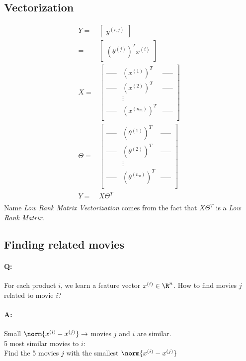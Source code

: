 \subsection{Vectorization}
\begin{align*}
	Y ={}      & \begin{bmatrix}
		y^{(i,j)}
	\end{bmatrix} \\
	={}        & \begin{bmatrix}
		\left(\theta^{(j)}\right)^Tx^{(i)}
	\end{bmatrix} \\
	X ={}      & \begin{bmatrix}
		\text{-----} & \left(x^{(1)}\right)^T   & \text{-----} \\
		\text{-----} & \left(x^{(2)}\right)^T   & \text{-----} \\
		             & \vdots                   &              \\
		\text{-----} & \left(x^{(n_m)}\right)^T & \text{-----} \\
	\end{bmatrix} \\
	\Theta ={} & \begin{bmatrix}
		\text{-----} & \left(\theta^{(1)}\right)^T   & \text{-----} \\
		\text{-----} & \left(\theta^{(2)}\right)^T   & \text{-----} \\
		             & \vdots                        &              \\
		\text{-----} & \left(\theta^{(n_u)}\right)^T & \text{-----} \\
	\end{bmatrix} \\
	Y ={}      & X\Theta^T                  \\
\end{align*}
Name \emph{Low Rank Matrix Vectorization} comes from the fact that $X\Theta^T$
is a \emph{Low Rank Matrix}.

\subsection{Finding related movies}
\paragraph{Q:}
For each product $i$, we learn a feature vector $x^{(i)} \in \R^n$. How to find
movies $j$ related to movie $i$?
\paragraph{A:}
Small $\norm{x^{(i)} - x^{(j)}} \to$ movies $j$ and $i$ are similar.
\\5 most similar movies to $i$:\\
Find the 5 movies $j$ with the smallest $\norm{x^{(i)} - x^{(j)}}$

